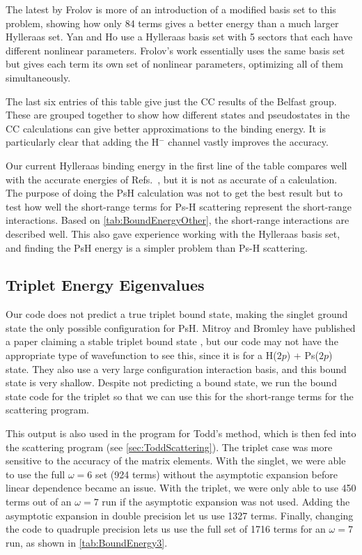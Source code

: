 \documentclass[Dissertation.tex]{subfiles}
\begin{document}
The latest by Frolov \cite{Frolov2010} is more of an introduction of a modified basis set to this problem, showing how only 84 terms gives a better energy than a much larger Hylleraas set. Yan and Ho \cite{Yan1999} use a Hylleraas basis set with 5 sectors that each have different nonlinear parameters. Frolov's work essentially uses the same basis set but gives each term its own set of nonlinear parameters, optimizing all of them simultaneously.

The last six entries of this table give just the CC results of the Belfast group. These are grouped together to show how different states and pseudostates in the CC calculations can give better approximations to the binding energy. It is particularly clear that adding the H$^-$ channel vastly improves the accuracy.

Our current Hylleraas binding energy in the first line of the table compares well with the accurate energies of Refs.~\cite{Bubin2006, Mitroy2006, Yan1999}, but it is not as accurate of a calculation. The purpose of doing the PsH calculation was not to get the best result but to test how well the short-range terms for Ps-H scattering represent the short-range interactions. Based on \cref{tab:BoundEnergyOther}, the short-range interactions are described well. This also gave experience working with the Hylleraas basis set, and finding the PsH energy is a simpler problem than Ps-H scattering.

\subsection{Triplet Energy Eigenvalues}
\label{sec:TripletEigenvalues}

Our code does not predict a true triplet bound state, making the singlet ground state the only possible configuration for PsH. Mitroy and Bromley have published a paper \cite{Mitroy2007} claiming a stable triplet bound state , but our code may not have the appropriate type of wavefunction to see this, since it is for a H($2p$) + Ps($2p$) state. They also use a very large configuration interaction basis, and this bound state is very shallow. Despite not predicting a bound state, we run the bound state code for the triplet so that we can use this for the short-range terms for the scattering program.

This output is also used in the program for Todd's method, which is then fed into the scattering program (see \cref{sec:ToddScattering}). The triplet case was more sensitive to the accuracy of the matrix elements. With the singlet, we were able to use the full $\omega = 6$ set (924 terms) without the asymptotic expansion before linear dependence became an issue. With the triplet, we were only able to use 450 terms out of an $\omega = 7$ run if the asymptotic expansion was not used. Adding the asymptotic expansion in double precision let us use 1327 terms. Finally, changing the code to quadruple precision lets us use the full set of 1716 terms for an $\omega = 7$ run, as shown in \cref{tab:BoundEnergy3}. 
\end{document}

